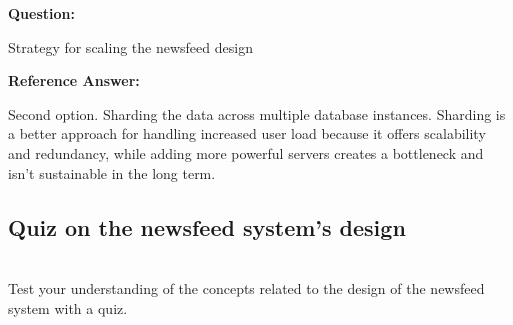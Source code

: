 \textbf{Question:}

Strategy for scaling the newsfeed design

\textbf{Reference Answer:}

Second option. Sharding the data across multiple database instances. Sharding is a better approach for handling increased user load because it offers scalability and redundancy, while adding more powerful servers creates a bottleneck and isn't sustainable in the long term.

\subsection{Quiz on the newsfeed system's design}\label{zied7TqpBt2--mcb9Felv}
\\
Test your understanding of the concepts related to the design of the newsfeed system with a quiz.

